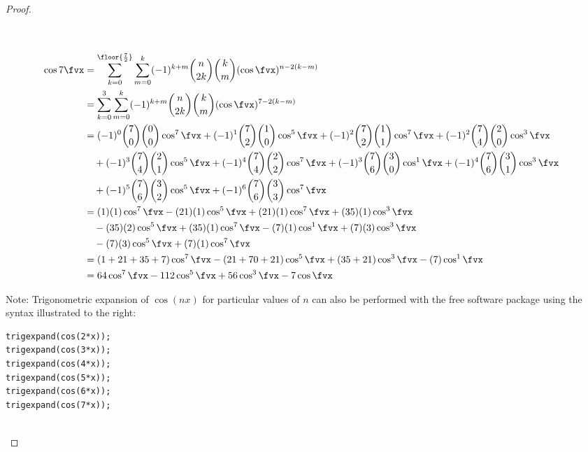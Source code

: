 \begin{proof}
\begin{align*}
\\
\\
  \cos7\fvx
    &= \sum_{k=0}^\floor{\frac{7}{2}}\sum_{m=0}^k      
         (-1)^{k+m}{n\choose 2k  }{k\choose m} (\cos\fvx)^{n-2(k-m)}
  \\&= \sum_{k=0}^3 \sum_{m=0}^k      
         (-1)^{k+m}{n\choose 2k  }{k\choose m} (\cos\fvx)^{7-2(k-m)}
  \\&= (-1)^0{7\choose0}{0\choose0}\cos^7\fvx +
       (-1)^1{7\choose2}{1\choose0}\cos^5\fvx +
       (-1)^2{7\choose2}{1\choose1}\cos^7\fvx + 
       (-1)^2{7\choose4}{2\choose0}\cos^3\fvx \\&\quad+ 
       (-1)^3{7\choose4}{2\choose1}\cos^5\fvx + 
       (-1)^4{7\choose4}{2\choose2}\cos^7\fvx + 
       (-1)^3{7\choose6}{3\choose0}\cos^1\fvx +
       (-1)^4{7\choose6}{3\choose1}\cos^3\fvx \\&\quad+
       (-1)^5{7\choose6}{3\choose2}\cos^5\fvx +
       (-1)^6{7\choose6}{3\choose3}\cos^7\fvx
  \\&=   ( 1)(1)\cos^7\fvx 
       - (21)(1)\cos^5\fvx 
       + (21)(1)\cos^7\fvx  
       + (35)(1)\cos^3\fvx \\&\quad 
       - (35)(2)\cos^5\fvx 
       + (35)(1)\cos^7\fvx  
       - ( 7)(1)\cos^1\fvx 
       + ( 7)(3)\cos^3\fvx \\&\quad
       - ( 7)(3)\cos^5\fvx
       + ( 7)(1)\cos^7\fvx
  \\&=   (1+21+35+7)\cos^7\fvx 
       - (21+70+21)\cos^5\fvx 
       + (35+21)\cos^3\fvx  
       - ( 7)\cos^1\fvx 
  \\&= 64\cos^7\fvx - 112\cos^5\fvx + 56\cos^3\fvx - 7\cos\fvx 
\end{align*}

\begin{minipage}{\tw-67mm}%
  Note: Trigonometric expansion of $\cos(nx)$ for particular values of $n$ 
  can also be performed with the free software package 
      \href{http://maxima.sourceforge.net/}{\texttrademark} using the syntax illustrated to the right:\footnotemark
\end{minipage}%
\hspace{10mm}%
\begin{minipage}{48mm}
\begin{lstlisting}  
trigexpand(cos(2*x));
trigexpand(cos(3*x));
trigexpand(cos(4*x));
trigexpand(cos(5*x));
trigexpand(cos(6*x));
trigexpand(cos(7*x));
\end{lstlisting}
\end{minipage}%
\mbox{}\\


\end{proof}

